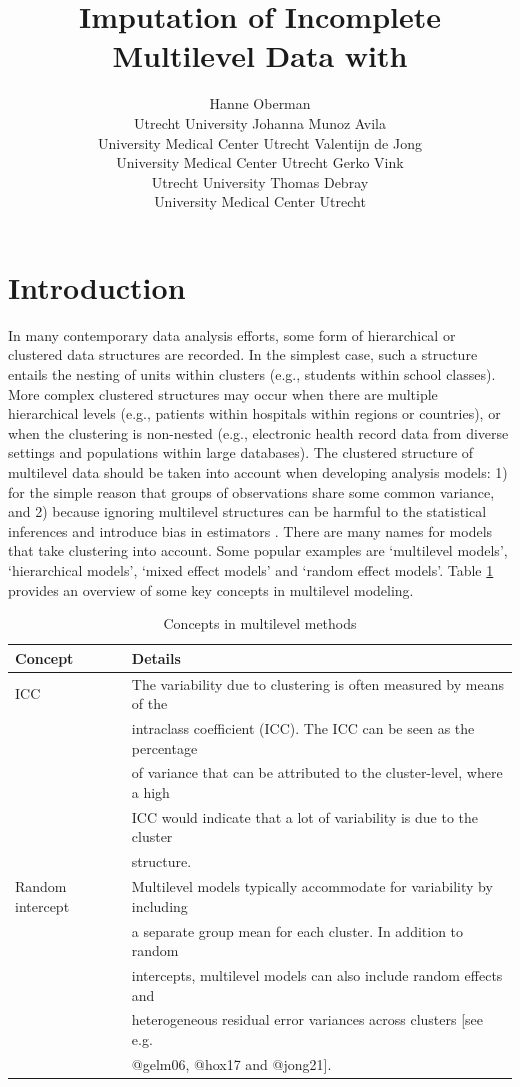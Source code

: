 \documentclass[
]{jss}
\author{
Hanne Oberman\\Utrecht University \And Johanna Munoz Avila\\University
Medical Center Utrecht \AND Valentijn de Jong\\University Medical
Center Utrecht \And Gerko Vink\\Utrecht University \AND Thomas
Debray\\University Medical Center Utrecht
}
\title{Imputation of Incomplete Multilevel Data with \pkg{mice}}
\begin{document}
\hypertarget{introduction}{%
\section{Introduction}\label{introduction}}

In many contemporary data analysis efforts, some form of hierarchical or
clustered data structures are recorded. In the simplest case, such a
structure entails the nesting of units within clusters (e.g., students
within school classes). More complex clustered structures may occur when
there are multiple hierarchical levels (e.g., patients within hospitals
within regions or countries), or when the clustering is non-nested
(e.g., electronic health record data from diverse settings and
populations within large databases). The clustered structure of
multilevel data should be taken into account when developing analysis
models: 1) for the simple reason that groups of observations share some
common variance, and 2) because ignoring multilevel structures can be
harmful to the statistical inferences and introduce bias in estimators
\citep{hox17}. There are many names for models that take clustering into
account. Some popular examples are `multilevel models', `hierarchical
models', `mixed effect models' and `random effect models'. Table
\ref{tab:clus} provides an overview of some key concepts in multilevel
modeling.

\begin{table}[tb]
\caption{Concepts in multilevel methods}
\label{tab:clus}
\centering
\begin{tabular}{ll}
\hline
\textbf{Concept} & \textbf{Details}   \\
\hline
ICC                 & The variability due to clustering is often measured by means of the \\
                    & intraclass coefficient (ICC). The ICC can be seen as the percentage \\
                    & of variance that can be attributed to the cluster-level, where a high \\
                    & ICC would indicate that a lot of variability is due to the cluster \\
                    & structure. \\
Random intercept    & Multilevel models typically accommodate for variability by including \\
                    & a separate group mean for each cluster. In addition to random \\
                    & intercepts, multilevel models can also include random effects and \\
                    & heterogeneous residual error variances across clusters [see e.g. \\
                    & @gelm06, @hox17 and @jong21]. \\
\hline
\end{tabular}
\end{table}
\end{document}
